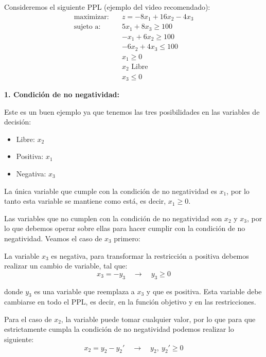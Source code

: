 Consideremos el siguiente PPL (ejemplo del video recomendado):
\begin{align*}
  \text{maximizar:} \quad   &z = -8x_1 + 16x_2 - 4x_3 \\[3pt]
  \text{sujeto a:} \quad    &5x_1 + 8x_3 \geq 100 \\
                            &-x_1 + 6x_2 \geq 100 \\
                            &-6x_2 + 4x_3 \leq 100 \\
                            &x_1 \geq 0 \\
                            &x_2 \text{ Libre} \\
                            &x_3 \leq0
\end{align*}

\noindent\textbf{1. Condición de no negatividad:}

Este es un buen ejemplo ya que tenemos las tres posibilidades en las variables de decisión:
\begin{itemize}
  \item Libre: \(x_2\)
  \item Positiva: \(x_1\)
  \item Negativa: \(x_3\)
\end{itemize}

La única variable que cumple con la condición de no negatividad es \(x_1\), por lo tanto esta variable se mantiene como está, es decir, \(x_1 \geq 0\). 

Las variables que no cumplen con la condición de no negatividad son \(x_2\) y \(x_3\), por lo que debemos operar sobre ellas para hacer cumplir con la condición de no negatividad. Veamos el caso de \(x_3\) primero: 

La variable \(x_3\) es negativa, para transformar la restricción a positiva debemos realizar un cambio de variable, tal que:
\[
  x_3 = -y_3 \quad \rightarrow \quad y_3 \geq 0
\]

\noindent donde \(y_3\) es una variable que reemplaza a \(x_3\) y que es positiva. Esta variable debe cambiarse en todo el PPL, es decir, en la función objetivo y en las restricciones. 

Para el caso de \(x_2\), la variable puede tomar cualquier valor, por lo que para que estrictamente cumpla la condición de no negatividad podemos realizar lo siguiente:
\[
  x_2 = y_2 - y_2' \quad \rightarrow \quad y_2,\ y_2' \geq 0
\]

